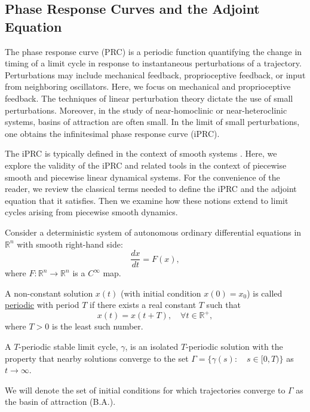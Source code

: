 \documentclass[12pt]{article}
\begin{document}
 
\subsection{Phase Response Curves and the Adjoint Equation}\label{sec:prc_and_adjoint}
The phase response curve (PRC) is a periodic function quantifying the change in timing of a limit cycle in response to  instantaneous perturbations of a trajectory.  Perturbations may include mechanical feedback, proprioceptive feedback, or input from neighboring oscillators.  Here, we focus on mechanical and proprioceptive feedback.  The techniques of linear perturbation theory dictate the use of small perturbations.  Moreover, in the study of near-homoclinic or near-heteroclinic systems, basins of attraction are often small. In the limit of small perturbations, one obtains the infinitesimal phase response curve (iPRC).

The iPRC is typically defined in the context of smooth systems \cite{ErmentroutTerman2010book}.  Here, we explore the validity of the iPRC and related tools in the context of piecewise smooth and piecewise linear dynamical systems.  For the convenience of the reader, we review the classical terms needed to define the iPRC and the adjoint equation that it satisfies.  Then we examine how these notions extend to limit cycles arising from piecewise smooth dynamics.

Consider a deterministic system of autonomous ordinary differential equations in $\mathbb{R}^n$ with smooth right-hand side:
  \begin{equation}
  \frac{dx}{dt} = F(x),
  \end{equation}
where $F : \mathbb{R}^n \rightarrow \mathbb{R}^n$ is a $C^\infty$ map.
\begin{definition}
 A non-constant solution $x(t)$ (with initial condition $x(0) = x_0$) is called \underline{periodic} with period $T$ if there exists a real constant $T$ such that 
\begin{equation}
 x(t) = x(t+T), \quad \forall t \in \mathbb{R}^+,
\end{equation}
where $T > 0$ is the least such number.
\end{definition}

\begin{definition}
 A $T$-periodic stable limit cycle, $\gamma$, is an isolated $T$-periodic solution with the property that nearby solutions converge to the set $\Gamma = \{\gamma(s): \quad s \in [0,T)\}$ as $t \rightarrow \infty$.
\end{definition}
  We will denote the set of initial conditions for which trajectories converge to $\Gamma$ as the basin of attraction (B.A.).
\end{document}
